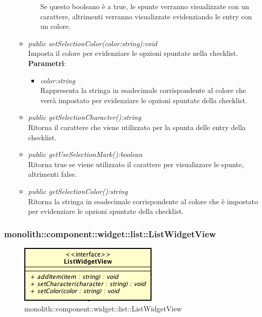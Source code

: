 \begin{itemize}
\begin{itemize}
\begin{itemize}
		Se questo booleano è a true, le spunte verranno visualizzate con un carattere, altrimenti verranno visualizzate evidenziando le entry con un colore.
		\end{itemize} 
	\item \textit{public setSelectionColor(color:string):void}\\
	Imposta il colore per evidenziare le opzioni spuntate nella checklist.
		\\ \textbf{Parametri}: \begin{itemize}
		\item \textit{color:string}\\
		Rappresenta la stringa in esadecimale corrispondente al colore che verrà impostato per evidenziare le opzioni spuntate della checklist.
		\end{itemize} 
	\item \textit{public getSelectionCharacter():string}\\
	Ritorna il carattere che viene utilizzato per la spunta delle entry della checklist.
	\item \textit{public getUseSelectionMark():boolean}\\
	Ritorna true se viene utilizzato il carattere per visualizzare le spunte, altrimenti false.
	\item \textit{public getSelectionColor():string}\\
	Ritorna la stringa in esadecimale corrispondente al colore che è impostato per evidenziare le opzioni spuntate della checklist.
	\end{itemize}
\end{itemize}

\subsubsection{monolith::component::widget::list::ListWidgetView}

\label{monolith::component::widget::list::ListWidgetView}
\begin{figure}[H]
	\centering
	\includegraphics[scale=0.5]{Sezioni/SottosezioniST/img/ListWidgetView.png}
	\caption{monolith::component::widget::list::ListWidgetView}
\end{figure}

